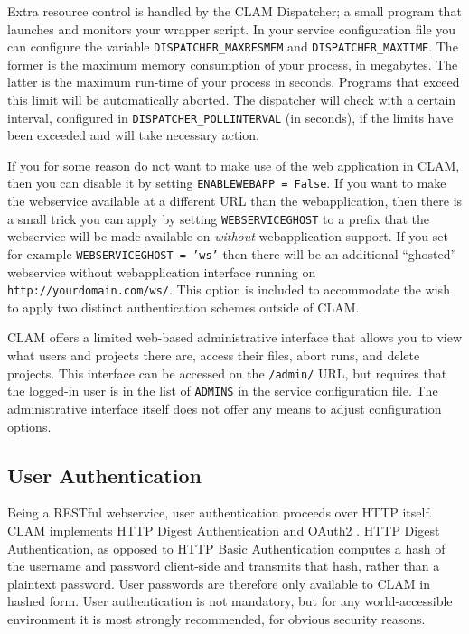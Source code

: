 \documentclass[a4paper,12pt]{report}
\begin{document}
Extra resource control is handled by the CLAM Dispatcher; a small program that
launches and monitors your wrapper script. In your service configuration file
you can configure the variable \texttt{DISPATCHER\_MAXRESMEM} and
\texttt{DISPATCHER\_MAXTIME}. The former is the maximum memory consumption of
your process, in megabytes. The latter is the maximum run-time of your process
in seconds. Programs that exceed this limit will be automatically aborted. The
dispatcher will check with a certain interval, configured in
\texttt{DISPATCHER\_POLLINTERVAL} (in seconds), if the limits have been
exceeded and will take necessary action.  
  

If you for some reason do not want to make use of the web application in CLAM,
then you can disable it by setting \texttt{ENABLEWEBAPP = False}. If you want
to make the webservice available at a different URL than the webapplication,
then there is a small trick you can apply by setting \texttt{WEBSERVICEGHOST}
to a prefix that the webservice will be made available on \emph{without}
webapplication support. If you set for example \texttt{WEBSERVICEGHOST = 'ws'}
then there will be an additional ``ghosted'' webservice without webapplication
interface running on \texttt{http://yourdomain.com/ws/}. This option is
included to accommodate the wish to apply two distinct authentication schemes
outside of CLAM. 

CLAM offers a limited web-based administrative interface that allows you to
view what users and projects there are,  access their files, abort runs, and
delete projects. This interface can be accessed on the \texttt{/admin/} URL,
but requires that the logged-in user is in the list of \texttt{ADMINS} in the
service configuration file. The administrative interface itself does not offer
any means to adjust configuration options.

\subsection{User Authentication}

Being a RESTful webservice, user authentication proceeds over HTTP itself. CLAM
implements HTTP Digest Authentication \cite{HTTPAUTH} and OAuth2 \cite{OAUTH2}. HTTP Digest
Authentication, as opposed to HTTP Basic Authentication computes a hash of the
username and password client-side and transmits that hash, rather than a
plaintext password. User passwords are therefore only available to CLAM in
hashed form. User authentication is not mandatory, but for any world-accessible
environment it is most strongly recommended, for obvious security reasons. 
\end{document}

